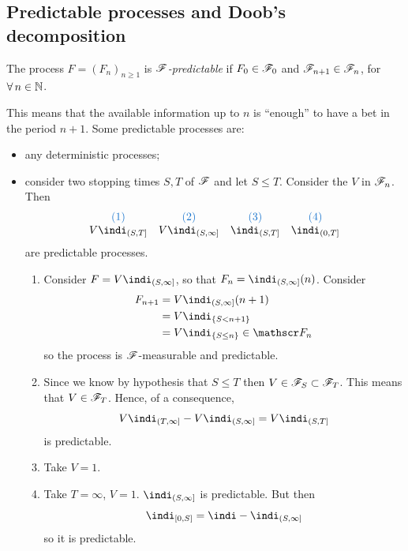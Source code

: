 \documentclass{report}
\begin{document}
\subsection{Predictable processes and Doob’s decomposition}
\begin{definition}
	The process $F={(F_{n})}_{n\geq1}$ is \emph{$\mathscr{F}$-predictable} if $F_{0}\in\mathscr{F}_{0}$ and $\mathscr{F}_{n+1}\in\mathscr{F}_{n}$, for $\forall\, n\in\mathbb{N}$.
\end{definition}
This means that the available information up to $n$ is ``enough'' to have a bet in the period $n+1$. Some predictable processes are:
\begin{itemize}
	\item any deterministic processes;
	\item consider two stopping times $S,T$ of $\mathscr{F}$ and let $S\leq T$. Consider the \rv{} $V$ in $\mathscr{F}_{n}$. Then
	\[\begin{array}{c c c c}
		\color{DodgerBlue3}(1)&\color{DodgerBlue3}(2)&\color{DodgerBlue3}(3)&\color{DodgerBlue3}(4)\\
		V\indi_{(S,T]}&V\indi_{(S,\infty]}&\indi_{(S,T]}&\indi_{(0,T]}
	\end{array}\]
	are predictable processes.
	\begin{fancyproof}
		\begin{enumerate}
			\item[\color{DodgerBlue3}(2)] Consider $F=V\indi_{(S,\infty]}$, so that $F_{n}=\indi_{(S,\infty]}(n)$. Consider \begin{align*}
				F_{n+1}&=V\indi_{(S,\infty]}(n+1)\\
				&=V\indi_{\{S<n+1\}}\\
				&=V\indi_{\{S\leq n\}}\in\F_{n}
			\end{align*}
			so the process is $\mathscr{F}$-measurable and predictable.
			\item[\color{DodgerBlue4}(1)] Since we know by hypothesis that $S\leq T$ then $V\in\mathscr{F}_{S}\subset\mathscr{F}_{T}$. This means that $V\in\mathscr{F}_{T}$. Hence, of a consequence,
			\begin{equation*}
				V\indi_{(T,\infty]}-V\indi_{(S,\infty]}=V\indi_{(S,T]}
			\end{equation*}
			is predictable.
			\item[\color{DodgerBlue3}(3)] Take $V=1$.
			\item[\color{DodgerBlue3}(4)] Take $T=\infty$, $V=1$. $\indi_{(S,\infty]}$ is predictable. But then 
			\[\indi_{[0,S]}=\indi-\indi_{(S,\infty]}\]
			so it is predictable.
		\end{enumerate}
	\end{fancyproof}
\end{itemize}
\end{document}
